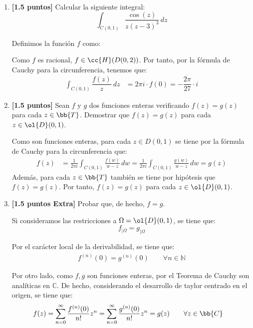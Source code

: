 \documentclass[12pt]{article}
\begin{document}
    \begin{ejercicio}[3 puntos]~
        \begin{enumerate}
            \item \textbf{[1.5 puntos]} Calcular la siguiente integral:
            \begin{equation*}
                \int_{C(0,1)} \frac{\cos(z)}{z(z-3)^3} \, dz
            \end{equation*}

            Definimos la función $f$ como:

            Como $f$ es racional, $f\in \cc{H}(D(0,2))$. Por tanto, por la fórmula de Cauchy para la circunferencia, tenemos que:
            \begin{align*}
                \int_{C(0,1)} \dfrac{f(z)}{z}\ dz &= 2\pi i \cdot f(0)=-\dfrac{2\pi}{27}\cdot i
            \end{align*}
            \item \textbf{[1.5 puntos]} Sean $f$ y $g$ dos funciones enteras verificando $f(z) = g(z)$ para cada $z \in \bb{T}$. Demostrar que $f(z) = g(z)$ para cada $z \in \ol{D}(0, 1)$.
            
            Como son funciones enteras, para cada $z\in D(0,1)$ se tiene por la fórmula de Cauchy para la circunferencia que:
            \begin{align*}
                f(z) &= \frac{1}{2\pi i} \int_{C(0,1)} \frac{f(w)}{w-z} \, dw
                = \frac{1}{2\pi i} \int_{C(0,1)} \frac{g(w)}{w-z} \, dw
                = g(z)
            \end{align*}
            Además, para cada $z\in \bb{T}$ también se tiene por hipótesis que $f(z)=g(z)$. Por tanto, $f(z)=g(z)$ para cada $z\in \ol{D}(0,1)$.
            \item \textbf{[1.5 puntos Extra]} Probar que, de hecho, $f = g$.
            
            Si consideramos las restricciones a $\Omega=\ol{D}(0,1)$, se tiene que:
            \begin{equation*}
                f_{\big| \Omega} = g_{\big| \Omega}
            \end{equation*}

            Por el carácter local de la derivabilidad, se tiene que:
            \begin{align*}
                f^{(n)}(0) = g^{(n)}(0) \qquad \forall n\in \mathbb{N}
            \end{align*}

            Por otro lado, como $f,g$ son funciones enteras, por el Teorema de Cauchy son analíticas en $\mathbb{C}$. De hecho, considerando el desarrollo de taylor centrado en el origen, se tiene que:
            \begin{align*}
                f(z) &= \sum_{n=0}^{\infty} \frac{f^{(n)}(0)}{n!} z^n = \sum_{n=0}^{\infty} \frac{g^{(n)}(0)}{n!} z^n = g(z)\qquad \forall z\in \bb{C}
            \end{align*}
        \end{enumerate}
    \end{ejercicio}
\end{document}

